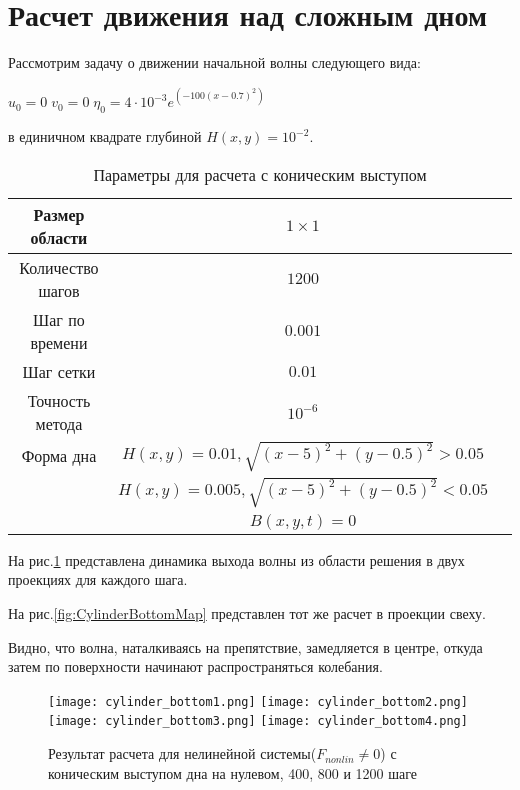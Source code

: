 \newpage
\addtocounter{section}{1}
\setcounter{equation}{0}
\setcounter{subsection}{0}
\section*{Расчет движения над сложным дном} 

Рассмотрим задачу о движении начальной волны следующего вида:

$u_0=0\;v_0=0\;\eta_0=4 \cdot 10^{-3}e^{(-100 (x-0.7)^2)}$

в единичном квадрате глубиной $H(x,y)=10^{-2}$.

\begin{table}[H]
    \label{tab:FirstResult}
    \caption{Параметры для расчета с коническим выступом}
    \begin{center}
	\begin{tabular}{|c|c|c|}
	    \hline
	    Размер области & $1\times1$\\
	    \hline
	    Количество шагов & $1200$\\
	    \hline
	    Шаг по времени & $0.001$\\
	    \hline
	    Шаг сетки & $0.01$\\
	    \hline
	    Точность метода & $10^{-6}$\\
	    \hline
	    Форма дна & $H(x,y)=0.01, \sqrt{(x-5)^2+(y-0.5)^2}>0.05$\\ 
	    & $H(x,y)=0.005, \sqrt{(x-5)^2+(y-0.5)^2}<0.05$\\
	    & $B(x,y,t)=0$\\
	    \hline
	\end{tabular}
    \end{center}
\end{table}

На рис.\ref{fig:CylinderBottom} представлена динамика выхода волны из области решения в двух проекциях для каждого шага.

На рис.\ref{fig:CylinderBottomMap} представлен тот же расчет в проекции свеху.

Видно, что волна, наталкиваясь на препятствие, замедляется в центре, откуда затем по поверхности начинают распространяться колебания.

\newpage
\begin{figure}[htp]
    \centering
    \vspace{12em}
    \texttt{[image: cylinder\_bottom1.png]}
    \texttt{[image: cylinder\_bottom2.png]}
    \texttt{[image: cylinder\_bottom3.png]}
    \texttt{[image: cylinder\_bottom4.png]}
    \caption{Результат расчета для нелинейной системы($F_{nonlin}\neq 0$) с коническим выступом дна на нулевом, 400, 800 и 1200 шаге}
    \label{fig:CylinderBottom}
\end{figure}

